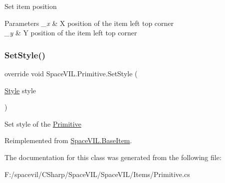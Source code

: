 Set item position 


\begin{DoxyParams}{Parameters}
{\em \+\_\+x} & X position of the item left top corner \\
\hline
{\em \+\_\+y} & Y position of the item left top corner \\
\hline
\end{DoxyParams}
\mbox{\label{class_space_v_i_l_1_1_primitive_ad2a9fbb75eddf7f36af72385a5453fb2}} 
\subsubsection{\texorpdfstring{Set\+Style()}{SetStyle()}}
{\footnotesize\ttfamily override void Space\+V\+I\+L.\+Primitive.\+Set\+Style (\begin{DoxyParamCaption}\item[{\mbox{\hyperlink{class_space_v_i_l_1_1_decorations_1_1_style}{Style}}}]{style }\end{DoxyParamCaption})\hspace{0.3cm}{\ttfamily [virtual]}}



Set style of the \mbox{\hyperlink{class_space_v_i_l_1_1_primitive}{Primitive}} 



Reimplemented from \mbox{\hyperlink{class_space_v_i_l_1_1_base_item_a74dec9854f0a7553ad3b50f140bfe07d}{Space\+V\+I\+L.\+Base\+Item}}.



The documentation for this class was generated from the following file\+:\begin{DoxyCompactItemize}
\item 
F\+:/spacevil/\+C\+Sharp/\+Space\+V\+I\+L/\+Space\+V\+I\+L/\+Items/Primitive.\+cs\end{DoxyCompactItemize}
